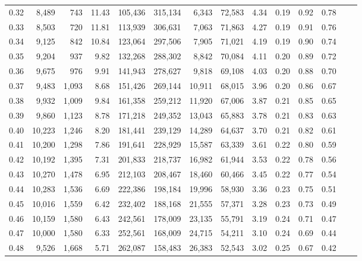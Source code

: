 \begin{tabular}{rrrrrrrrrrrrrr}
0.32 &   8,489 &    743 &   11.43 &  105,436 &  315,134 &   6,343 &  72,583 &  4.34 &  0.19 &  0.92 &      0.78 \\
0.33 &   8,503 &    720 &   11.81 &  113,939 &  306,631 &   7,063 &  71,863 &  4.27 &  0.19 &  0.91 &      0.76 \\
0.34 &   9,125 &    842 &   10.84 &  123,064 &  297,506 &   7,905 &  71,021 &  4.19 &  0.19 &  0.90 &      0.74 \\
0.35 &   9,204 &    937 &    9.82 &  132,268 &  288,302 &   8,842 &  70,084 &  4.11 &  0.20 &  0.89 &      0.72 \\
0.36 &   9,675 &    976 &    9.91 &  141,943 &  278,627 &   9,818 &  69,108 &  4.03 &  0.20 &  0.88 &      0.70 \\
0.37 &   9,483 &  1,093 &    8.68 &  151,426 &  269,144 &  10,911 &  68,015 &  3.96 &  0.20 &  0.86 &      0.67 \\
0.38 &   9,932 &  1,009 &    9.84 &  161,358 &  259,212 &  11,920 &  67,006 &  3.87 &  0.21 &  0.85 &      0.65 \\
0.39 &   9,860 &  1,123 &    8.78 &  171,218 &  249,352 &  13,043 &  65,883 &  3.78 &  0.21 &  0.83 &      0.63 \\
0.40 &  10,223 &  1,246 &    8.20 &  181,441 &  239,129 &  14,289 &  64,637 &  3.70 &  0.21 &  0.82 &      0.61 \\
0.41 &  10,200 &  1,298 &    7.86 &  191,641 &  228,929 &  15,587 &  63,339 &  3.61 &  0.22 &  0.80 &      0.59 \\
0.42 &  10,192 &  1,395 &    7.31 &  201,833 &  218,737 &  16,982 &  61,944 &  3.53 &  0.22 &  0.78 &      0.56 \\
0.43 &  10,270 &  1,478 &    6.95 &  212,103 &  208,467 &  18,460 &  60,466 &  3.45 &  0.22 &  0.77 &      0.54 \\
0.44 &  10,283 &  1,536 &    6.69 &  222,386 &  198,184 &  19,996 &  58,930 &  3.36 &  0.23 &  0.75 &      0.51 \\
0.45 &  10,016 &  1,559 &    6.42 &  232,402 &  188,168 &  21,555 &  57,371 &  3.28 &  0.23 &  0.73 &      0.49 \\
0.46 &  10,159 &  1,580 &    6.43 &  242,561 &  178,009 &  23,135 &  55,791 &  3.19 &  0.24 &  0.71 &      0.47 \\
0.47 &  10,000 &  1,580 &    6.33 &  252,561 &  168,009 &  24,715 &  54,211 &  3.10 &  0.24 &  0.69 &      0.44 \\
0.48 &   9,526 &  1,668 &    5.71 &  262,087 &  158,483 &  26,383 &  52,543 &  3.02 &  0.25 &  0.67 &      0.42 \\

\end{tabular}
